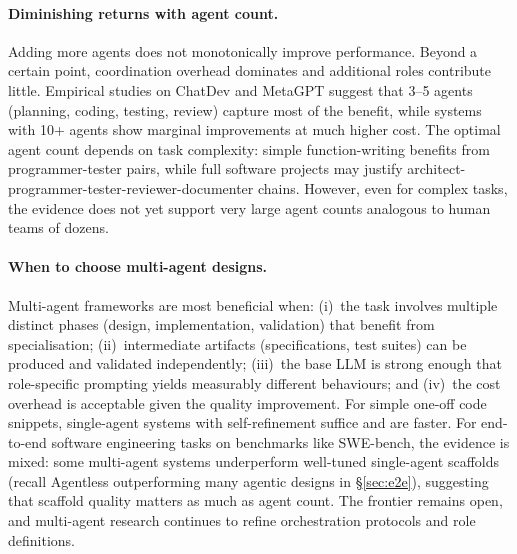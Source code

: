 \paragraph{Diminishing returns with agent count.}
Adding more agents does not monotonically improve performance. Beyond a certain
point, coordination overhead dominates and additional roles contribute little.
Empirical studies on ChatDev and MetaGPT suggest that 3--5 agents (planning,
coding, testing, review) capture most of the benefit, while systems with 10+
agents show marginal improvements at much higher cost. The optimal agent count
depends on task complexity: simple function-writing benefits from
programmer-tester pairs, while full software projects may justify
architect-programmer-tester-reviewer-documenter chains. However, even for
complex tasks, the evidence does not yet support very large agent counts
analogous to human teams of dozens.

\paragraph{When to choose multi-agent designs.}
Multi-agent frameworks are most beneficial when: (i)~the task involves multiple
distinct phases (design, implementation, validation) that benefit from
specialisation; (ii)~intermediate artifacts (specifications, test suites) can
be produced and validated independently; (iii)~the base LLM is strong enough
that role-specific prompting yields measurably different behaviours; and
(iv)~the cost overhead is acceptable given the quality improvement. For
simple one-off code snippets, single-agent systems with self-refinement suffice
and are faster. For end-to-end software engineering tasks on benchmarks like
SWE-bench, the evidence is mixed: some multi-agent systems underperform
well-tuned single-agent scaffolds (recall Agentless outperforming many agentic
designs in \S\ref{sec:e2e}), suggesting that scaffold quality matters as much
as agent count. The frontier remains open, and multi-agent research continues
to refine orchestration protocols and role definitions.
